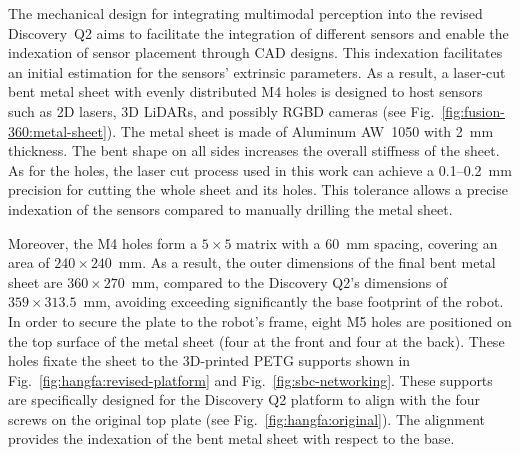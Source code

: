 \documentclass[letterpaper,10pt,conference]{IEEEtran} %
\def\figref#1{Fig.~\ref{#1}}
\begin{document}
The mechanical design for integrating multimodal perception
into the revised Discovery~Q2 aims to facilitate the integration of
different sensors and enable the indexation of
sensor placement through CAD designs.
This indexation facilitates an initial estimation
for the sensors' extrinsic parameters.
As a result, a laser-cut bent metal sheet with evenly distributed M4 holes
is designed to host sensors such as 2D lasers, 3D LiDARs,
and possibly RGBD cameras (see \figref{fig:fusion-360:metal-sheet}).
The metal sheet is made of Aluminum AW~1050 with 2~mm thickness.
The bent shape on all sides increases the
overall stiffness of the sheet.
As for the holes, the laser cut process
used in this work can achieve a
0.1--0.2~mm precision for cutting the whole sheet and its holes.
This tolerance allows a precise indexation of the sensors
compared to manually drilling the metal sheet.

Moreover, the M4 holes form a $5\times 5$ matrix
with a 60~mm spacing, covering an area of $240\times 240$~mm.
As a result, the outer dimensions of the final bent metal sheet
are $360\times 270$~mm, compared to the Discovery Q2's dimensions
of $359\times 313.5$~mm, avoiding exceeding significantly
the base footprint of the robot.
In order to secure the plate to the robot's frame,
eight M5 holes are positioned on the top surface of the metal sheet
(four at the front and four at the back).
These holes fixate the sheet to the 3D-printed PETG supports
shown in \figref{fig:hangfa:revised-platform} and \figref{fig:sbc-networking}.
These supports are specifically designed for the Discovery Q2 platform
to align with the four screws on the original top plate
(see \figref{fig:hangfa:original}).
The alignment provides the indexation of the bent metal sheet with respect to
the base.
\end{document}

